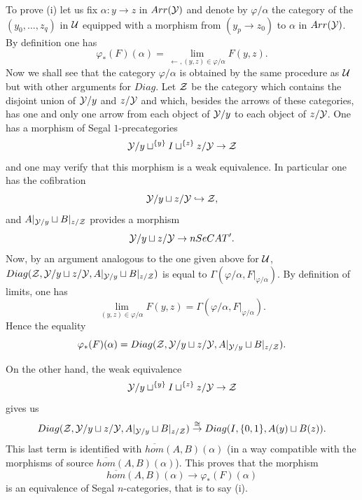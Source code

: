 To prove (i) let us fix $\alpha : y\rightarrow z$ in $Arr({\cal Y} )$
and denote by
$\varphi /\alpha $ the category of the $(y_0,\ldots , z_q)$ in ${\cal U} $
equipped with a
morphism
from $(y_p\rightarrow z_0)$ to $\alpha$ in $Arr({\cal Y} )$.
By definition one has
$$
\varphi _{\ast}(F)(\alpha ) = \lim _{\leftarrow , (y,z)\in \varphi /\alpha }
F(y,z).
$$
Now we shall see that the category $\varphi /\alpha $ is obtained by the same
procedure as
${\cal U} $ but with other arguments for $Diag$. Let ${\cal Z}$ be the category which
contains the disjoint union of ${\cal Y} /y$ and $z/{\cal Y}$ and which, besides the
arrows of these
categories, has one and only one arrow from each object of ${\cal Y}
/y$ to
each object of $z/{\cal Y}$. One has a morphism of Segal $1$-precategories
$$
{\cal Y} /y \sqcup ^{\{ y\} } I \sqcup ^{\{ z \} } z/{\cal Y} \rightarrow {\cal Z}
$$
and one may verify that this morphism is a weak equivalence.
In particular one has the cofibration
$$
{\cal Y} /y \sqcup z/{\cal Y} \hookrightarrow {\cal Z} ,
$$
and $A|_{{\cal Y} /y}\sqcup B|_{z/{\cal Z}}$ provides a morphism
$$
{\cal Y} /y \sqcup z/{\cal Y}\rightarrow nSeCAT'.
$$
Now, by an argument
analogous to the one given above for ${\cal U}$,
$Diag ({\cal Z} ,{\cal Y} /y \sqcup z/{\cal Y}, A|_{{\cal Y} /y}\sqcup B|_{z/{\cal Z}})$
is equal to
$\Gamma (\varphi /\alpha , F|_{\varphi /\alpha }).$
By definition of limits, one has
$$
\lim _{(y,z)\in \varphi /\alpha }
F(y,z) = \Gamma (\varphi /\alpha , F|_{\varphi /\alpha }).
$$
Hence the equality
$$
\varphi _{\ast}(F)(\alpha )=
Diag ({\cal Z} ,{\cal Y} /y \sqcup z/{\cal Y}, A|_{{\cal Y} /y}\sqcup B|_{z/{\cal Z}}).
$$

On the other hand, the weak equivalence
$$
{\cal Y} /y \sqcup ^{\{ y\} } I \sqcup ^{\{ z \} } z/{\cal Y} \rightarrow {\cal Z}
$$
gives us
$$
Diag ({\cal Z} ,{\cal Y} /y \sqcup z/{\cal Y}, A|_{{\cal Y} /y}\sqcup B|_{z/{\cal Z}})
\stackrel{\cong}{\rightarrow}
Diag(I, \{ 0,1\} , A(y)\sqcup B(z)).
$$
This last term is identified with $\overline{hom}(A,B)(\alpha )$ (in a way
compatible with the morphisms of source $\overline{hom}(A,B)(\alpha
)$).
This proves that the morphism
$$
\overline{hom}(A,B)(\alpha )\rightarrow
\varphi _{\ast}(F)(\alpha )
$$
is an equivalence of Segal $n$-categories, that is to say (i).

